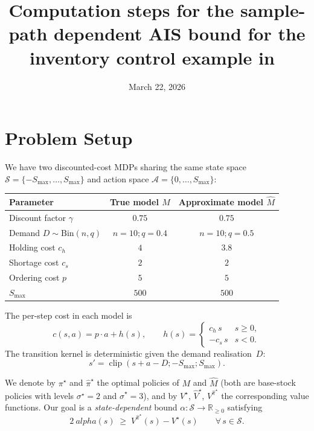 \documentclass[11pt]{article}
\title{Computation steps for the sample-path dependent AIS bound for the inventory control example in~\cite{bozkurt_model_approx}}
\author{}
\date{March 22, 2026}
\newcommand{\Smax}{S_{\max}}
\newcommand{\clip}{\operatorname{clip}}
\newcommand{\pistar}{\pi^\star}
\newcommand{\pihatstar}{\hat\pi^\star}
\newcommand{\Vstar}{V^\star}
\newcommand{\Vhatstar}{\hat V^\star}
\newcommand{\Vpihat}{V^{\pihatstar}}
\begin{document}
\maketitle

\section{Problem Setup}

We have two discounted-cost MDPs sharing the same state space
$\mathcal{S} = \{-\Smax, \ldots, \Smax\}$ and action space
$\mathcal{A} = \{0, \ldots, \Smax\}$:
%
\begin{center}
\begin{tabular}{lcc}
\toprule
Parameter & True model $M$ & Approximate model $\hat M$ \\
\midrule
Discount factor $\gamma$ & $0.75$ & $0.75$ \\
Demand $D \sim \mathrm{Bin}(n,q)$ & $n=10 ; q=0.4$ & $n=10 ; q=0.5$ \\
Holding cost $c_h$ & $4$ & $3.8$ \\
Shortage cost $c_s$ & $2$ & $2$ \\
Ordering cost $p$ & $5$ & $5$ \\
$\Smax$ & $500$ & $500$ \\
\bottomrule
\end{tabular}
\end{center}

The per-step cost in each model is
\[
  c(s,a) = p \cdot a + h(s),
  \qquad
  h(s) = \begin{cases} c_h \, s & s \ge 0, \\ -c_s \, s & s < 0. \end{cases}
\]
The transition kernel is deterministic given the demand realisation~$D$:
\[
  s' = \clip(s + a - D ; -\Smax ; \Smax).
\]

We denote by $\pistar$ and $\pihatstar$ the optimal policies of $M$ and $\hat M$
(both are base-stock policies with levels $\sigma^\star = 2$ and
$\hat\sigma^\star = 3$), and by $\Vstar$, $\Vhatstar$, $\Vpihat$ the
corresponding value functions.  Our goal is a \emph{state-dependent} bound
$\alpha \colon \mathcal{S} \to \mathbb{R}_{\ge 0}$ satisfying
\begin{equation}\label{eq:goal}
  2\ alpha(s) \;\ge\; \Vpihat(s) - \Vstar(s) \qquad \forall\, s \in \mathcal{S}.
\end{equation}
\end{document}
